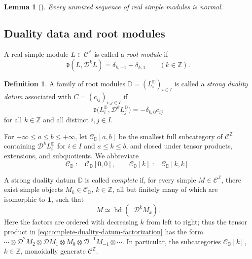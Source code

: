 \documentclass[12pt, reqno]{amsart}
\theoremstyle{plain}
\newtheorem{lemma}[theorem]{Lemma}
\theoremstyle{definition}
\newtheorem{definition}[theorem]{Definition}
\numberwithin{equation}{section}
\newcommand{\ZZ}{\mathbb{Z}}
\newcommand{\DD}{\mathbb{D}}
\begin{document}
\begin{lemma}[{\cite[Lemma~5.3]{kashiwara2023pbw}}]
    Every unmixed sequence of real simple modules is normal.
\end{lemma}

\subsection{Duality data and root modules}

A real simple module \(L\in\mathscr C^{\ZZ}\) is called a \emph{root
module} if
\begin{equation}\label{eq:root-module}
    \mathfrak d(L,\mathcal D^kL)
    =\delta_{k,-1}+\delta_{k,1}
    \qquad (k\in\ZZ).
\end{equation}

\begin{definition}\label{def:strong-duality-datum}
    A family of root modules \(\DD=(L_i^{\DD})_{i\in I}\) is called a
    \emph{strong duality datum} associated with
    \(C=(c_{ij})_{i,j\in I}\) if
    \begin{equation}\label{eq:strong-duality-datum}
        \mathfrak d\bigl(L_i^{\DD},\mathcal D^kL_j^{\DD}\bigr)
        =-\delta_{k,0}c_{ij}
    \end{equation}
    for all \(k\in\ZZ\) and all distinct \(i,j\in I\).
\end{definition}


 For
\(-\infty\leq a\leq b\leq+\infty\), let
\(\mathscr C_{\DD}[a,b]\) be the smallest full subcategory of
\(\mathscr C^{\ZZ}\) containing \(\mathcal D^kL_i^{\DD}\) for
\(i\in I\) and \(a\leq k\leq b\), and closed under tensor products,
extensions, and subquotients. We abbreviate
\begin{equation}\label{eq:shifted-D-categories}
    \mathscr C_{\DD}:=\mathscr C_{\DD}[0,0],
    \qquad
    \mathscr C_{\DD}[k]:=\mathscr C_{\DD}[k,k].
\end{equation}

A strong duality datum \(\DD\) is called \emph{complete} if, for every
simple \(M\in\mathscr C^{\ZZ}\), there exist simple objects
\(M_k\in\mathscr C_{\DD}\), \(k\in\ZZ\), all but finitely many of which
are isomorphic to \(\mathbf1\), such that
\begin{equation}\label{eq:complete-duality-datum-factorization}
    M\simeq\operatorname{hd}\left(
        \mathop{\bigotimes_{k\in\ZZ}^{\longleftarrow}}
        \mathcal D^kM_k
    \right).
\end{equation}
Here the factors are ordered with decreasing \(k\) from left to right; thus
the tensor product in \eqref{eq:complete-duality-datum-factorization} has
the form
\(\cdots\otimes\mathcal D^2M_2\otimes\mathcal D M_1\otimes M_0
\otimes\mathcal D^{-1}M_{-1}\otimes\cdots\). In particular, the
subcategories \(\mathscr C_{\DD}[k]\), \(k\in\ZZ\), monoidally generate
\(\mathscr C^{\ZZ}\).
\end{document}
